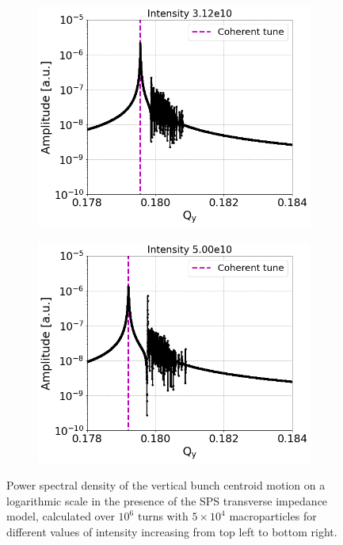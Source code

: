 \begin{figure}[htp]
\begin{subfigure}{.45\textwidth}
        \label{fig:study_9d}
    \end{subfigure}
    \begin{subfigure}{.45\textwidth}
        \centering
        \includegraphics[width=.95\linewidth]{images/Ch7/fft_sps_forSchottky_tbt_270GeV_PN1e-8_WakesON_ayy6000_QpxQpy0_6D_Nb1e4_InialOffsetY1e-4m_turns1e6_IntensityScan_intensity3.12e10.png}  
        \label{fig:study_9e}
    \end{subfigure}
    \begin{subfigure}{.45\textwidth}
            \centering
            \includegraphics[width=.95\linewidth]{images/Ch7/fft_sps_forSchottky_tbt_270GeV_PN1e-8_WakesON_ayy6000_QpxQpy0_6D_Nb1e4_InialOffsetY1e-4m_turns1e6_IntensityScan_intensity5.00e10.png}  
            \label{fig:study_9f}
    \end{subfigure}
    \caption{Power spectral density of the vertical bunch centroid motion on a logarithmic scale in the presence of the SPS transverse impedance model, calculated over $10^6$ turns with $5 \times 10^4$ macroparticles for different values of intensity increasing from top left to bottom right.}
    \label{fig:study_9_schottky_noise_intnensity_scan}
\end{figure}

